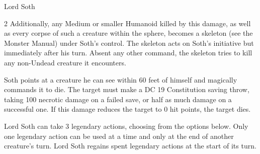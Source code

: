 \documentclass[10pt,a4paper,twoside,bg=print,twocolumn,openany,nodeprecatedcode]{dndbook}
\begin{document}
\begin{DndMonster}[float*=b,width=\textwidth + 8pt]{Lord Soth}
\begin{multicols}{2}
Additionally, any Medium or smaller Humanoid killed by this damage, as well as every corpse of such a creature within the sphere, becomes a skeleton (see the Monster Manual) under Soth's control. The skeleton acts on Soth's initiative but immediately after his turn. Absent any other command, the skeleton tries to kill any non-Undead creature it encounters.

Soth points at a creature he can see within 60 feet of himself and magically commands it to die. The target must make a DC 19 Constitution saving throw, taking 100 necrotic damage on a failed save, or half as much damage on a successful one. If this damage reduces the target to 0 hit points, the target dies.

Lord Soth can take 3 legendary actions, choosing from the options below. Only one legendary action can be used at a time and only at the end of another creature's turn. Lord Soth regains spent legendary actions at the start of its turn.

\begin{DndMonsterLegendaryActions}
\end{DndMonsterLegendaryActions}
\end{multicols}
\end{DndMonster}
\end{document}

